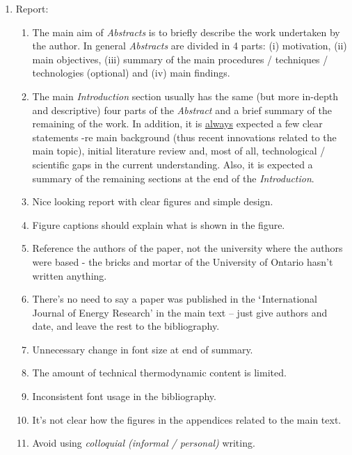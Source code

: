 \documentclass[14pt,twoside]{report}
\begin{document}
\begin{enumerate}

\item Report:
\begin{enumerate}
%
\item The main aim of {\it Abstracts} is to briefly describe the work undertaken by the author. In general {\it Abstracts} are divided in 4 parts: (i) motivation, (ii) main objectives, (iii) summary of the main procedures / techniques / technologies (optional) and (iv) main findings. 
%
\item The main {\it Introduction} section usually has the same (but more in-depth and descriptive) four parts of the {\it Abstract} and a brief summary of the remaining of the work. In addition, it is \underline{always} expected a few clear statements -re main background (thus recent innovations related to the main topic), initial literature review and, most of all, technological / scientific gaps in the current understanding. Also, it is expected a summary of the remaining sections at the end of the {\it Introduction}.
%
\item Nice looking report with clear figures and simple design.
%
\item Figure captions should explain what is shown in the figure.
%
\item Reference the authors of the paper, not the university where the authors were based - the bricks and mortar of the University of Ontario hasn't written anything.
%
\item There's no need to say a paper was published in the $\lq$International Journal of Energy Research' in the main text -- just give authors and date, and leave the rest to the bibliography.
%
\item Unnecessary change in font size at end of summary.
%
\item The amount of technical thermodynamic content is limited.
%
\item Inconsistent font usage in the bibliography.
%
\item It's not clear how the figures in the appendices related to the main text.
%
%
\item Avoid using {\it colloquial (informal / personal)} writing.
%

\end{enumerate}
\end{enumerate}
\end{document}

